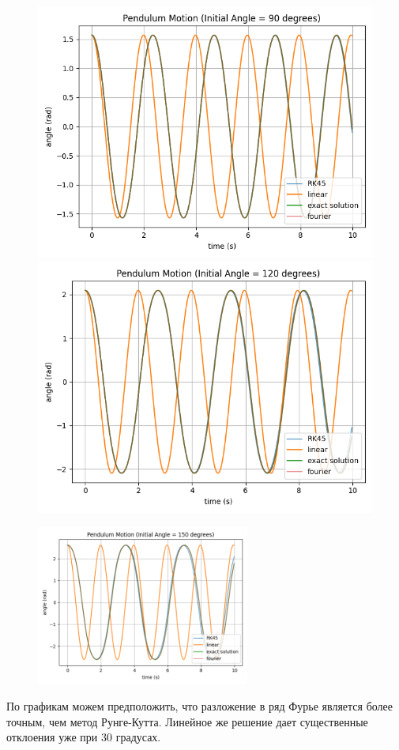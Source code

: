 \documentclass[a4paper,12pt]{article}
\begin{document}
\begin{figure}[!htb]
  \includegraphics[width=\linewidth]{90.png}\label{90}
\endminipage\hfill
{}
  \includegraphics[width=\linewidth]{120.png}\label{120}
\endminipage\hfill
\end{figure}

\begin{figure}[!htb]
    \centering
    \includegraphics[width=70mm]{150.png}
\end{figure}
По графикам можем предположить, что разложение в ряд Фурье является более точным, чем метод Рунге-Кутта. Линейное же решение дает существенные отклоения уже при 30 градусах.
\end{document}
